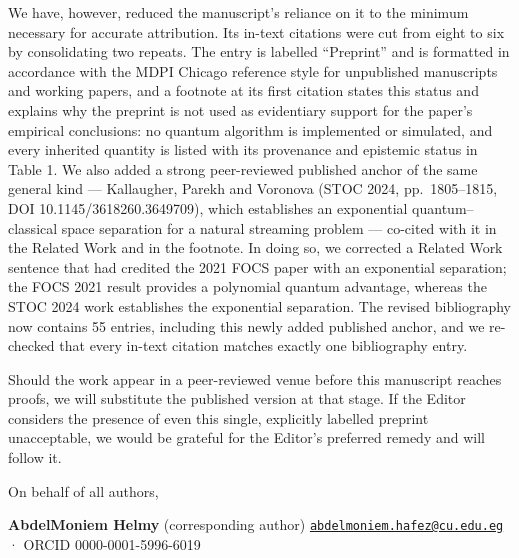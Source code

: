 \documentclass[
  11pt,
]{article}
\begin{document}
We have, however, reduced the manuscript's reliance on it to the minimum
necessary for accurate attribution. Its in-text citations were cut from
eight to six by consolidating two repeats. The entry is labelled
``Preprint'' and is formatted in accordance with the MDPI Chicago
reference style for unpublished manuscripts and working papers, and a
footnote at its first citation states this status and explains why the
preprint is not used as evidentiary support for the paper's empirical
conclusions: no quantum algorithm is implemented or simulated, and every
inherited quantity is listed with its provenance and epistemic status in
Table 1. We also added a strong peer-reviewed published anchor of the
same general kind --- Kallaugher, Parekh and Voronova (STOC 2024,
pp.~1805--1815, DOI 10.1145/3618260.3649709), which establishes an
exponential quantum--classical space separation for a natural streaming
problem --- co-cited with it in the Related Work and in the footnote. In
doing so, we corrected a Related Work sentence that had credited the
2021 FOCS paper with an exponential separation; the FOCS 2021 result
provides a polynomial quantum advantage, whereas the STOC 2024 work
establishes the exponential separation. The revised bibliography now
contains 55 entries, including this newly added published anchor, and we
re-checked that every in-text citation matches exactly one bibliography
entry.

Should the work appear in a peer-reviewed venue before this manuscript
reaches proofs, we will substitute the published version at that stage.
If the Editor considers the presence of even this single, explicitly
labelled preprint unacceptable, we would be grateful for the Editor's
preferred remedy and will follow it.

On behalf of all authors,

\textbf{AbdelMoniem Helmy} (corresponding author)
\href{mailto:abdelmoniem.hafez@cu.edu.eg}{\nolinkurl{abdelmoniem.hafez@cu.edu.eg}}
· ORCID 0000-0001-5996-6019
\end{document}
